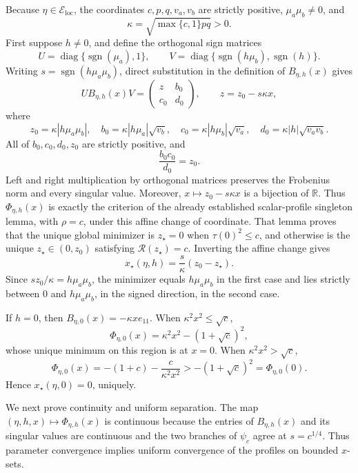 Because \(\eta\in\mathcal E_{\mathrm{loc}}\), the coordinates \(c,p,q,v_a,v_b\) are strictly positive, \(\mu_a\mu_b\neq0\), and
\[
 \kappa=\sqrt{\max\{c,1\}pq}>0.
\]
First suppose \(h\neq0\), and define the orthogonal sign matrices
\[
 U=\operatorname{diag}\{\operatorname{sgn}(\mu_a),1\},
 \qquad
 V=\operatorname{diag}\{\operatorname{sgn}(h\mu_b),\operatorname{sgn}(h)\}.
\]
Writing \(s=\operatorname{sgn}(h\mu_a\mu_b)\), direct substitution in the definition of \(B_{\eta,h}(x)\) gives
\[
 UB_{\eta,h}(x)V
 =\begin{pmatrix}z&b_0\\c_0&d_0\end{pmatrix},
 \qquad z=z_0-s\kappa x,
\]
where
\[
 z_0=\kappa|h\mu_a\mu_b|,
 \quad b_0=\kappa|h\mu_a|\sqrt{v_b},
 \quad c_0=\kappa|h\mu_b|\sqrt{v_a},
 \quad d_0=\kappa|h|\sqrt{v_av_b}.
\]
All of \(b_0,c_0,d_0,z_0\) are strictly positive, and
\[
 \frac{b_0c_0}{d_0}=z_0.
\]
Left and right multiplication by orthogonal matrices preserves the Frobenius norm and every singular value.  Moreover, \(x\mapsto z_0-s\kappa x\) is a bijection of \(\mathbb R\).  Thus \(\Phi_{\eta,h}(x)\) is exactly the criterion of the already established scalar-profile singleton lemma, with \(\rho=c\), under this affine change of coordinate.  That lemma proves that the unique global minimizer is \(z_\star=0\) when \(\tau(0)^2\leq c\), and otherwise is the unique \(z_\star\in(0,z_0)\) satisfying \(\mathcal R(z_\star)=c\).  Inverting the affine change gives
\[
 x_\star(\eta,h)=\frac{s}{\kappa}(z_0-z_\star).
\]
Since \(sz_0/\kappa=h\mu_a\mu_b\), the minimizer equals \(h\mu_a\mu_b\) in the first case and lies strictly between \(0\) and \(h\mu_a\mu_b\), in the signed direction, in the second case.

If \(h=0\), then \(B_{\eta,0}(x)=-\kappa xe_{11}\).  When \(\kappa^2x^2\leq\sqrt c\),
\[
 \Phi_{\eta,0}(x)=\kappa^2x^2-(1+\sqrt c)^2,
\]
whose unique minimum on this region is at \(x=0\).  When \(\kappa^2x^2>\sqrt c\),
\[
 \Phi_{\eta,0}(x)=-(1+c)-\frac{c}{\kappa^2x^2}
 >-(1+\sqrt c)^2=\Phi_{\eta,0}(0).
\]
Hence \(x_\star(\eta,0)=0\), uniquely.

We next prove continuity and uniform separation.  The map \((\eta,h,x)\mapsto\Phi_{\eta,h}(x)\) is continuous because the entries of \(B_{\eta,h}(x)\) and its singular values are continuous and the two branches of \(\psi_c\) agree at \(s=c^{1/4}\).  Thus parameter convergence implies uniform convergence of the profiles on bounded \(x\)-sets.

